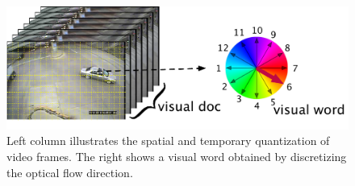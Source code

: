 \begin{figure}
\centering
    \includegraphics[width=0.8\linewidth]{./img/scene_learning/visual_doc.pdf}
    \caption{Left column illustrates the spatial and temporary quantization of video frames. The right shows a visual word obtained by discretizing the optical flow direction.}
    \label{fig:scene-visual-doc}
\end{figure}